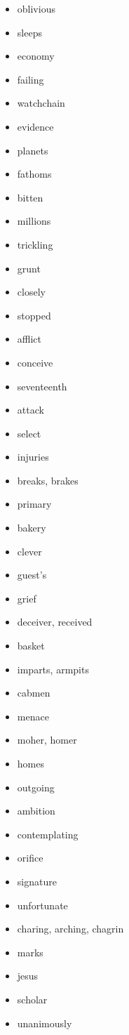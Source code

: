 \documentclass{article}
\begin{document}
\begin{itemize}
    \item oblivious
    \item sleeps
    \item economy
    \item failing
    \item watchchain
    \item evidence
    \item planets
    \item fathoms
    \item bitten
    \item millions
    \item trickling
    \item grunt
    \item closely
    \item stopped
    \item afflict
    \item conceive
    \item seventeenth
    \item attack
    \item select
    \item injuries
    \item breaks, brakes
    \item primary
    \item bakery
    \item clever
    \item guest's
    \item grief
    \item deceiver, received
    \item basket
    \item imparts, armpits
    \item cabmen
    \item menace
    \item moher, homer
    \item homes
    \item outgoing
    \item ambition
    \item contemplating
    \item orifice
    \item signature
    \item unfortunate
    \item charing, arching, chagrin
    \item marks
    \item jesus
    \item scholar
    \item unanimously

\end{itemize}
\end{document}
